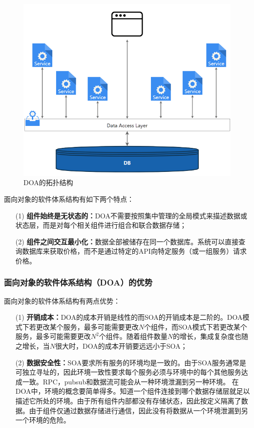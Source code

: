 \documentclass[article]{BJTU-thesis}
\begin{document}
	\begin{figure}[!htbp]
		\centering
		\includegraphics[scale=0.8]{4.png}
		\caption{DOA的拓扑结构}
		\label{fig:fig4}
	\end{figure}

	面向对象的软件体系结构有如下两个特点：
	\begin{enumerate}
		\item[(1)] \textbf{组件始终是无状态的：}DOA不需要按照集中管理的全局模式来描述数据或状态层，而是对每个相关组件进行组合和联合数据存储；
		\item[(2)] \textbf{组件之间交互最小化：}数据全部被储存在同一个数据库。系统可以直接查询数据库来获取价格，而不是通过特定的API向特定服务（或一组服务）请求价格。
	\end{enumerate}
	
	\subsubsection{面向对象的软件体系结构（DOA）的优势}

	面向对象的软件体系结构有两点优势：
		\begin{enumerate}
		\item[(1)] \textbf{开销成本：}DOA的成本开销是线性的而SOA的开销成本是二阶的。DOA模式下若更改某个服务，最多可能需要更改$N$个组件，而SOA模式下若更改某个服务，最多可能需要更改$N^2$个组件。随着组件数量$N$的增长，集成复杂度也随之增长，当$N$很大时，DOA的成本开销要远远小于SOA；
		\item[(2)] \textbf{数据安全性：}SOA要求所有服务的环境均是一致的。由于SOA服务通常是可独立寻址的，因此环境一致性要求每个服务必须与环境中的每个其他服务达成一致。RPC，pubsub和数据流可能会从一种环境泄漏到另一种环境。
		在DOA中，环境的概念要简单得多。知道一个组件连接到哪个数据存储层就足以描述它所处的环境。由于所有组件内部都没有存储状态，因此按定义隔离了数据。由于组件仅通过数据存储进行通信，因此没有将数据从一个环境泄漏到另一个环境的危险。
	\end{enumerate}
	
\end{document}
